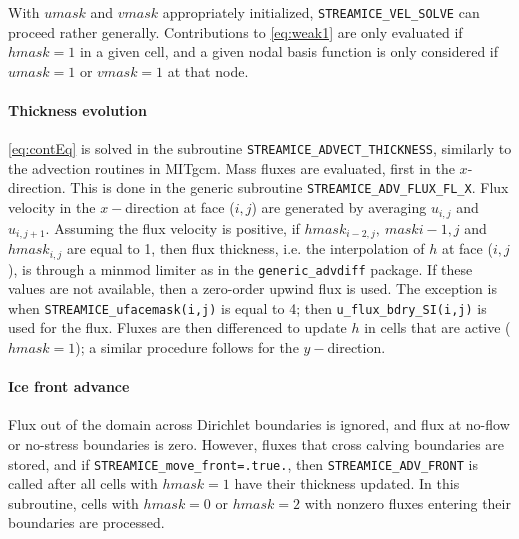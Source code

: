 With $umask$ and $vmask$ appropriately initialized, \texttt{STREAMICE\_VEL\_SOLVE} can proceed rather generally. Contributions to \eqref{eq:weak1} are only
evaluated if $hmask=1$ in a given cell, and a given nodal basis function is only considered if $umask=1$ or $vmask=1$ at that node.

\paragraph{Thickness evolution}

\eqref{eq:contEq} is solved in the subroutine \texttt{STREAMICE\_ADVECT\_THICKNESS}, similarly to the advection routines in MITgcm. Mass fluxes are evaluated, first in the $x$-direction. This is done in the generic subroutine \texttt{STREAMICE\_ADV\_FLUX\_FL\_X}. Flux velocity in the $x-$direction at face ($i,j$) are generated by averaging $u_{i,j}$ and $u_{i,j+1}$. Assuming the flux velocity is positive, if $hmask_{i-2,j},\ mask{i-1,j}$ and $hmask_{i,j}$ are equal to 1, then flux thickness, i.e. the interpolation of $h$ at face ($i,j$), is through a minmod limiter as in the \texttt{generic\_advdiff} package. If these values are not available, then a zero-order upwind flux is used. The exception is when \texttt{STREAMICE\_ufacemask(i,j)} is equal to 4; then \texttt{u\_flux\_bdry\_SI(i,j)} is used for the flux. Fluxes are then differenced to update $h$ in cells that are active ($hmask=1$); a similar procedure follows for the $y-$direction.

\paragraph{Ice front advance}

Flux out of the domain across Dirichlet boundaries is ignored, and flux at no-flow or no-stress boundaries is zero. However, fluxes that cross calving boundaries are stored, and if \texttt{STREAMICE\_move\_front=.true.}, then \texttt{STREAMICE\_ADV\_FRONT} is called after all cells with $hmask=1$ have their thickness updated. In this subroutine, cells with $hmask=0$ or $hmask=2$ with nonzero fluxes entering their boundaries are processed. 

